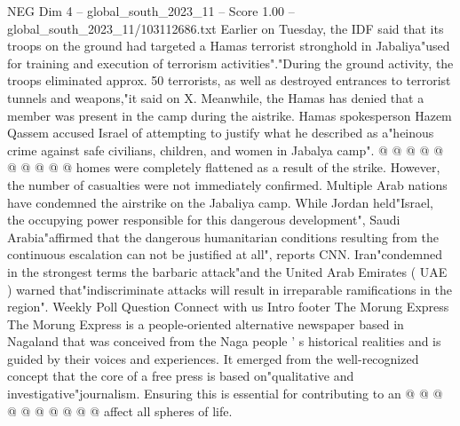 \begin{textsample}{NEG Dim 4 – global\_south\_2023\_11 – Score 1.00 – global\_south\_2023\_11/103112686.txt}
Earlier on Tuesday, the IDF said that its troops on the ground had targeted a Hamas terrorist stronghold in Jabaliya"used for training and execution of terrorism activities"."During the ground activity, the troops eliminated approx. 50 terrorists, as well as destroyed entrances to terrorist tunnels and weapons,"it said on X.
Meanwhile, the Hamas has denied that a member was present in the camp during the aistrike.
Hamas spokesperson Hazem Qassem accused Israel of attempting to justify what he described as a"heinous crime against safe civilians, children, and women in Jabalya camp". @ @ @ @ @ @ @ @ @ @ homes were completely flattened as a result of the strike.
However, the number of casualties were not immediately confirmed.
Multiple Arab nations have condemned the airstrike on the Jabaliya camp.
While Jordan held"Israel, the occupying power responsible for this dangerous development", Saudi Arabia"affirmed that the dangerous humanitarian conditions resulting from the continuous escalation can not be justified at all", reports CNN.
Iran"condemned in the strongest terms the barbaric attack"and the United Arab Emirates ( UAE ) warned that"indiscriminate attacks will result in irreparable ramifications in the region".
Weekly Poll Question Connect with us Intro footer The Morung Express The Morung Express is a people-oriented alternative newspaper based in Nagaland that was conceived from the Naga people ' s historical realities and is guided by their voices and experiences.
It emerged from the well-recognized concept that the core of a free press is based on"qualitative and investigative"journalism.
Ensuring this is essential for contributing to an @ @ @ @ @ @ @ @ @ @ affect all spheres of life.

\end{textsample}
